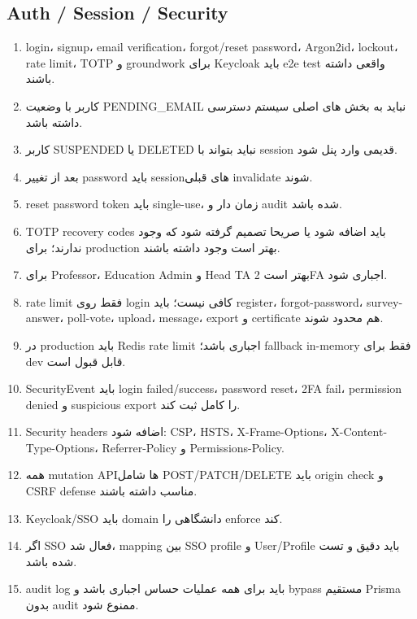 \documentclass[11pt,a4paper]{article}
\begin{document}
\subsection{Auth / Session / Security}
\begin{enumerate}[label=\arabic*. ,resume]
\item login، signup، email verification، forgot/reset password، Argon2id، lockout، rate limit، TOTP و groundwork برای Keycloak باید e2e test واقعی داشته باشند.
\item کاربر با وضعیت PENDING\_EMAIL نباید به بخش های اصلی سیستم دسترسی داشته باشد.
\item کاربر SUSPENDED یا DELETED نباید بتواند با session قدیمی وارد پنل شود.
\item بعد از تغییر password باید sessionهای قبلی invalidate شوند.
\item reset password token باید single-use، زمان دار و audit شده باشد.
\item TOTP recovery codes باید اضافه شود یا صریحا تصمیم گرفته شود که وجود ندارند؛ برای production بهتر است وجود داشته باشند.
\item برای Professor، Education Admin و Head TA بهتر است 2FA اجباری شود.
\item rate limit فقط روی login کافی نیست؛ باید register، forgot-password، survey-answer، poll-vote، upload، message، export و certificate هم محدود شوند.
\item در production باید Redis rate limit اجباری باشد؛ fallback in-memory فقط برای dev قابل قبول است.
\item SecurityEvent باید login failed/success، password reset، 2FA fail، permission denied و suspicious export را کامل ثبت کند.
\item Security headers اضافه شود: CSP، HSTS، X-Frame-Options، X-Content-Type-Options، Referrer-Policy و Permissions-Policy.
\item همه mutation APIها شامل POST/PATCH/DELETE باید origin check و CSRF defense مناسب داشته باشند.
\item Keycloak/SSO باید domain دانشگاهی را enforce کند.
\item اگر SSO فعال شد، mapping بین SSO profile و User/Profile باید دقیق و تست شده باشد.
\item audit log باید برای همه عملیات حساس اجباری باشد و bypass مستقیم Prisma بدون audit ممنوع شود.
\end{enumerate}
\end{document}
